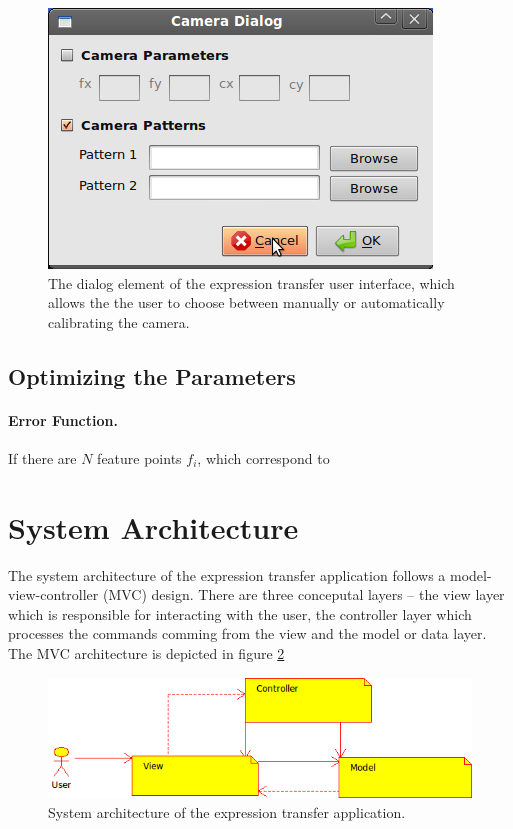 \documentclass[11pt,a4paper]{report}
\begin{document}
\begin{figure}[H]
\begin{centering}
\includegraphics[scale=0.60]{images/cameraDialog.png}
\par\end{centering}

\caption{The dialog element of the expression transfer user interface, which
  allows the the user to choose between manually or automatically calibrating
  the camera.}
\label{fg:camdialog}

\end{figure}

\subsection{Optimizing the Parameters}
\paragraph{Error Function.}
If there are $N$ feature points $f_i$, which correspond to 

\section{System Architecture}
The system architecture of the expression transfer application follows a
model-view-controller (MVC) design. There are three conceputal layers -- the
view layer which is responsible for interacting with the user, the controller
layer which processes the commands comming from the view and the model or data
layer. The MVC architecture is depicted in figure \ref{fg:mvc} 

\begin{figure}[H]
\begin{centering}
\includegraphics[scale=0.75]{images/mvc.png}
\par\end{centering}

\caption{System architecture of the expression transfer application.}
\label{fg:mvc}
\end{figure}
\end{document}
